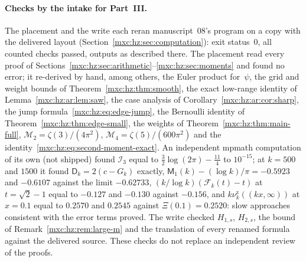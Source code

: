 \documentclass[11pt]{article}
\numberwithin{equation}{section}
\theoremstyle{definition}
\theoremstyle{remark}
\newcommand{\hznu}{\nu^{\mathrm z}}
\begin{document}
\paragraph{Checks by the intake for Part~III.} The placement and the write
each reran manuscript~08's program on a copy with the delivered layout
(Section~\ref{mxc:hz:sec:computation}): exit status~0, all counted checks
passed, outputs as described there. The placement read every proof of
Sections~\ref{mxc:hz:sec:arithmetic}--\ref{mxc:hz:sec:moments} and found no
error; it re-derived by hand, among others, the Euler product
for~$\psi$, the grid and weight bounds of Theorem~\ref{mxc:hz:thm:smooth},
the exact low-range identity of Lemma~\ref{mxc:hz:ar:lem:saw}, the case
analysis of Corollary~\ref{mxc:hz:ar:cor:sharp}, the jump
formula~\eqref{mxc:hz:eq:edge-jump}, the Bernoulli identity of
Theorem~\ref{mxc:hz:thm:edge-small}, the weights of
Theorem~\ref{mxc:hz:thm:main-full}, $\mathcal M_2=\zeta(3)/(4\pi^2)$,
$\mathcal M_4=\zeta(5)/(600\pi^2)$ and the identity~\eqref{mxc:hz:eq:second-moment-exact}.
An independent mpmath computation of its own (not shipped) found
$\mathcal I_3$ equal to $\frac32\log(2\pi)-\frac{11}4$ to $10^{-15}$; at
$k=500$ and $1500$ it found $\mathsf D_k=2(c-G_k)$ exactly,
$\mathsf M_1(k)-(\log k)/\pi=-0.5923$ and $-0.6107$ against the limit
$-0.62733$, $(k/\log k)(\mathcal F_k(t)-t)$ at $t=\sqrt2-1$ equal to
$-0.127$ and $-0.130$ against $-0.156$, and $k\hznu_k((kx,\infty))$ at
$x=0.1$ equal to $0.2570$ and $0.2545$ against $\Xi(0.1)=0.2520$: slow
approaches consistent with the error terms proved. The write checked
$H_{1,s}$, $H_{2,s}$, the bound of Remark~\ref{mxc:hz:rem:large-m} and the
translation of every renamed formula against the delivered source. These
checks do not replace an independent review of the proofs.
\end{document}
